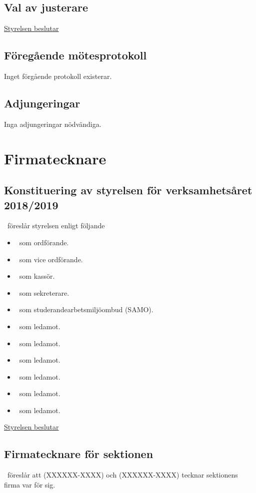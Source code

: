 \documentclass[11pt]{dtekprotokoll}
\begin{document}
  \subsection{Val av justerare}
    \underline{Styrelsen beslutar}\\
  \subsection{Föregående mötesprotokoll}
     Inget förgående protokoll existerar.
  \subsection{Adjungeringar}
     Inga adjungeringar nödvändiga.

  \section{Firmatecknare}
  \subsection{Konstituering av styrelsen för verksamhetsåret 2018/2019}
    \ordf\ föreslår styrelsen enligt följande
    \begin{itemize}
      \item \ordf~som ordförande.
      \item \vice~som vice ordförande.
      \item \kass~som kassör.
      \item \sekr~som sekreterare.
      \item \samo~som studerandearbetsmiljöombud (SAMO).
      \item \nollkordf~som ledamot.
      \item \deltaordf~som ledamot.
      \item \sexordf~som ledamot.
      \item \rustordf~som ledamot.
      \item \dagordf~som ledamot.
      \item \dnsordf~som ledamot.
    \end{itemize}

    \underline{Styrelsen beslutar}\\

  \subsection{Firmatecknare för sektionen}
    \ordf\ föreslår att \ordf(XXXXXX-XXXX) och \kass(XXXXXX-XXXX) tecknar sektionens firma var för sig.
\end{document}
